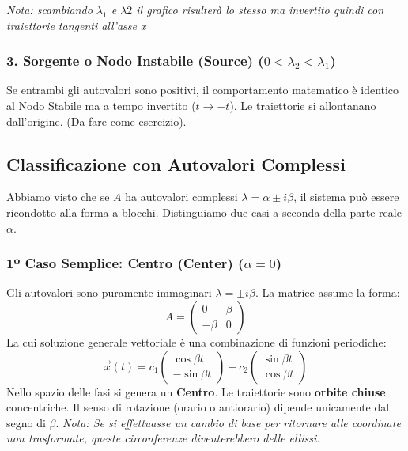 \documentclass[openany]{book}
\theoremstyle{definition}
\theoremstyle{remark}
\begin{document}
\emph{Nota:   scambiando $\lambda_1$ e $\lambda2$ il grafico risulterà lo stesso ma invertito quindi con traiettorie tangenti all'asse x}

\subsubsection*{3. Sorgente o Nodo Instabile (Source) ($0 < \lambda_2 < \lambda_1$)}
Se entrambi gli autovalori sono positivi, il comportamento matematico è identico al Nodo Stabile ma a tempo invertito ($t \to -t$). Le traiettorie si allontanano dall'origine. (Da fare come esercizio).

\subsection{Classificazione con Autovalori Complessi}

Abbiamo visto che se $A$ ha autovalori complessi $\lambda = \alpha \pm i\beta$, il sistema può essere ricondotto alla forma a blocchi. Distinguiamo due casi a seconda della parte reale $\alpha$.

\subsubsection*{1º Caso Semplice: Centro (Center) ($\alpha = 0$)}
Gli autovalori sono puramente immaginari $\lambda = \pm i\beta$. La matrice assume la forma:
\begin{equation}
    A = \begin{pmatrix} 0 & \beta \\ -\beta & 0 \end{pmatrix}
\end{equation}
La cui soluzione generale vettoriale è una combinazione di funzioni periodiche:
\begin{equation}
    \vec{x}(t) = c_1 \begin{pmatrix} \cos \beta t \\ -\sin \beta t \end{pmatrix} + c_2 \begin{pmatrix} \sin \beta t \\ \cos \beta t \end{pmatrix}
\end{equation}
Nello spazio delle fasi si genera un \textbf{Centro}. Le traiettorie sono \textbf{orbite chiuse} concentriche. Il senso di rotazione (orario o antiorario) dipende unicamente dal segno di $\beta$. 
\textit{Nota: Se si effettuasse un cambio di base per ritornare alle coordinate non trasformate, queste circonferenze diventerebbero delle ellissi.}
\end{document}
